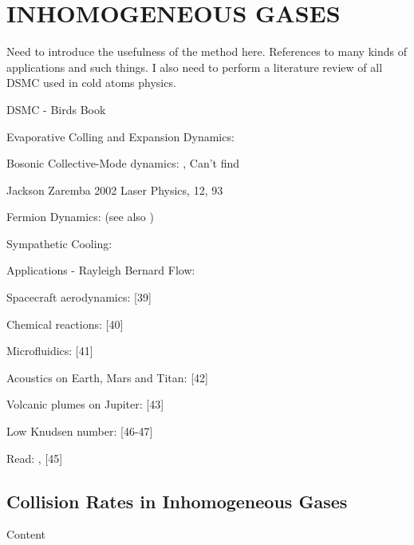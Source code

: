 
\chapter{INHOMOGENEOUS GASES} %

\label{ch:inhomogas} %


Need to introduce the usefulness of the method here. References to many kinds of applications and such things. I also need to perform a literature review of all DSMC used in cold atoms physics.

DSMC - Birds Book \cite{Bird1994}

Evaporative Colling and Expansion Dynamics: \cite{Wu1996, Wu1997, Wu1998}

Bosonic Collective-Mode dynamics: \cite{Jackson2001, Jackson2001b, Jackson2002, Jackson2002b, Jackson2002c}, Can't find 

Jackson Zaremba 2002 Laser Physics, 12, 93

Fermion Dynamics: \cite{Urban2006, Urban2007, Urban2008, Lepers2010} (see also \cite{Vignolo2002, Toschi2003, Capuzzi2004, Toschi2004})

Sympathetic Cooling: \cite{Barletta2010, Barletta2011}

Applications - Rayleigh Bernard Flow: \cite{Watanabe1994}

Spacecraft aerodynamics: [39]

Chemical reactions: [40]

Microfluidics: [41]

Acoustics on Earth, Mars and Titan: [42]

Volcanic plumes on Jupiter: [43]

Low Knudsen number: [46-47]

Read: \sout{\cite{Minguzzi2004}}, [45]


\section{Collision Rates in Inhomogeneous Gases}

Content


